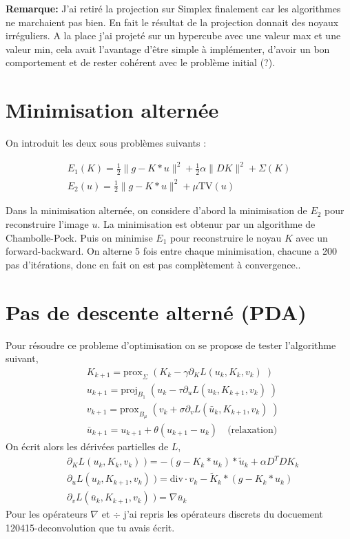 \documentclass[a4paper]{article}
\newenvironment{remarque}{\textbf{Remarque:}}{}
\begin{document}
\begin{remarque}
J'ai retiré la projection sur Simplex finalement car les algorithmes ne marchaient pas bien. 
En fait le résultat de la projection donnait des noyaux irréguliers.
A la place j'ai projeté sur un hypercube avec une valeur max et une valeur min, cela avait l'avantage d'être simple à implémenter, d'avoir un bon comportement et de rester cohérent avec le problème initial (?).
\end{remarque}

\section{Minimisation alternée}

On introduit les deux sous problèmes suivants :

\begin{align}
E_1(K) = \frac{1}{2} \| g - K * u\|^2 + \frac{1}{2} \alpha \| D K \|^2 + \Sigma(K) \\
E_2(u) = \frac{1}{2} \| g - K * u\|^2 +  \mu \text{TV} (u)
\end{align}

Dans la minimisation alternée, on considere d'abord la minimisation de $E_2$ 
pour reconstruire l'image $u$. 
La minimisation est obtenur par un algorithme de Chambolle-Pock.
 Puis on minimise $E_1$ pour reconstruire le noyau $K$ avec un forward-backward.
On alterne 5 fois entre chaque minimisation, chacune a 200 pas d'itérations, donc en fait on est pas complètement à convergence..



\section{Pas de descente alterné (PDA)}
%


Pour résoudre ce probleme d'optimisation on se propose de tester l'algorithme suivant,
\begin{align}
& K_{k+1} = \text{prox}_{\Sigma} \; (K_k - \gamma \partial_K L(u_k,K_k,v_k) \; )\\
& u_{k+1} = \text{proj}_{B_1} \; (u_k - \tau \partial_u L(u_k,K_{k+1},v_k) \; )\\
& v_{k+1}         = \text{prox}_{B_\mu} \; (v_k + \sigma \partial_v L (\bar{u}_k,K_{k+1},v_k) \; )\\
&\bar{u}_{k+1} = u_{k+1} + \theta (u_{k+1} - u_k) \quad \text{(relaxation)}
\end{align}
On écrit alors les dérivées partielles de $L$,
\begin{align}
& \partial_K L(u_k,K_k,v_k) \; ) = - (g-K_k*u_k)*\tilde{u}_k+ \alpha D^TDK_k \\
& \partial_u L(u_k,K_{k+1},v_k) \; ) = \text{div} \cdot v_k - \tilde{K}_k * (g-K_k*u_k)\\
& \partial_v L (\bar{u}_k,K_{k+1},v_k) \; ) =  \nabla \bar{u}_k
\end{align}
Pour les opérateurs $\nabla$ et $\div$ j'ai repris les opérateurs discrets du docuement 120415-deconvolution que tu avais écrit.
\end{document}
